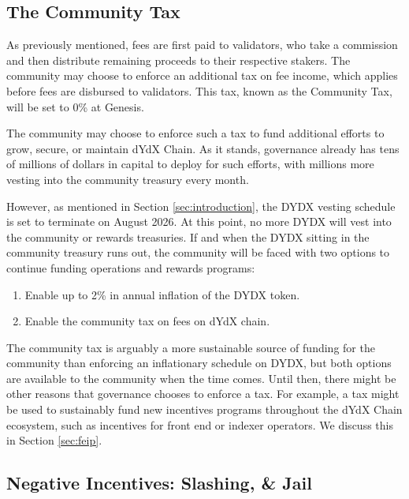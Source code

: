         \subsection{The Community Tax}

            As previously mentioned, fees are first paid to validators, who take a commission and then distribute remaining proceeds to their respective stakers. The community may choose to enforce an additional tax on fee income, which applies before fees are disbursed to validators. This tax, known as the Community Tax, will be set to 0\% at Genesis.

            The community may choose to enforce such a tax to fund additional efforts to grow, secure, or maintain dYdX Chain. As it stands, governance already has tens of millions of dollars in capital to deploy for such efforts, with millions more vesting into the community treasury every month. 

            However, as mentioned in Section \ref{sec:introduction}, the DYDX vesting schedule is set to terminate on August 2026. At this point, no more DYDX will vest into the community or rewards treasuries. If and when the DYDX sitting in the community treasury runs out, the community will be faced with two options to continue funding operations and rewards programs:

            \begin{enumerate}
                \item Enable up to 2\% in annual inflation of the DYDX token.
                \item Enable the community tax on fees on dYdX chain.
            \end{enumerate}

            The community tax is arguably a more sustainable source of funding for the community than enforcing an inflationary schedule on DYDX, but both options are available to the community when the time comes. Until then, there might be other reasons that governance chooses to enforce a tax. For example, a tax might be used to sustainably fund new incentives programs throughout the dYdX Chain ecosystem, such as incentives for front end or indexer operators. We discuss this in Section \ref{sec:feip}.

    \subsection{Negative Incentives: Slashing, \& Jail} \label{subsec:mev}

